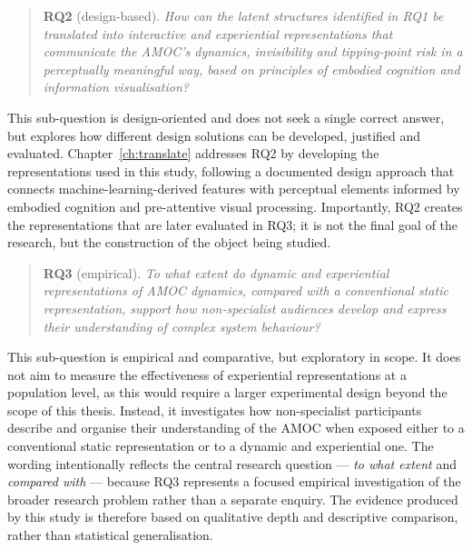 \begin{quote}

\textbf{RQ2} (design-based). \emph{How can the latent structures identified in \textup{RQ1} be translated into interactive and experiential representations that communicate the AMOC's dynamics, invisibility and tipping-point risk in a perceptually meaningful way, based on principles of embodied cognition and information visualisation?}

\end{quote}

This sub-question is design-oriented and does not seek a single correct answer, but explores how different design solutions can be developed, justified and evaluated. Chapter~\ref{ch:translate} addresses RQ2 by developing the representations used in this study, following a documented design approach that connects machine-learning-derived features with perceptual elements informed by embodied cognition and pre-attentive visual processing. Importantly, RQ2 creates the representations that are later evaluated in RQ3; it is not the final goal of the research, but the construction of the object being studied.

\begin{quote}

\textbf{RQ3} (empirical). \emph{To what extent do dynamic and experiential representations of AMOC dynamics, compared with a conventional static representation, support how non-specialist audiences develop and express their understanding of complex system behaviour?}

\end{quote}

This sub-question is empirical and comparative, but exploratory in scope. It does not aim to measure the effectiveness of experiential representations at a population level, as this would require a larger experimental design beyond the scope of this thesis. Instead, it investigates how non-specialist participants describe and organise their understanding of the AMOC when exposed either to a conventional static representation or to a dynamic and experiential one. The wording intentionally reflects the central research question --- \emph{to what extent} and \emph{compared with} --- because RQ3 represents a focused empirical investigation of the broader research problem rather than a separate enquiry. The evidence produced by this study is therefore based on qualitative depth and descriptive comparison, rather than statistical generalisation.


